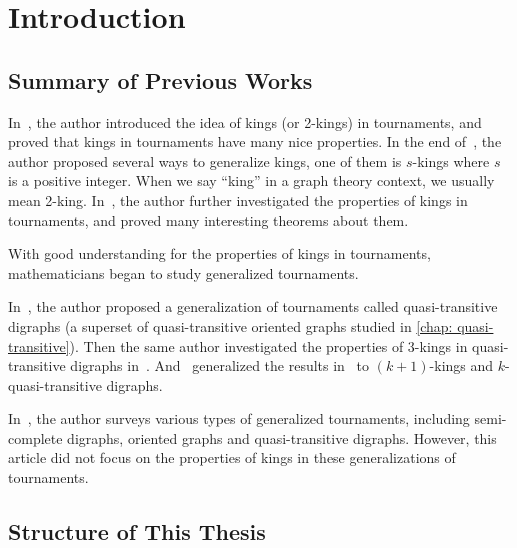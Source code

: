 \chapter{Introduction}

\section{Summary of Previous Works}

In~\cite{maurer_king_1980}, the author introduced
the idea of kings (or 2-kings) in tournaments,
and proved that kings in tournaments have many nice properties.
In the end of~\cite{maurer_king_1980},
the author proposed several ways to generalize kings,
one of them is \(s\)-kings where \(s\) is a positive integer.
When we say ``king'' in a graph theory context,
we usually mean 2-king.
In~\cite{reid_every_1982}, the author
further investigated the properties of kings in tournaments,
and proved many interesting theorems about them.

With good understanding for the properties of kings in tournaments,
mathematicians began to study generalized tournaments.

In~\cite{bangjensen_quasitransitive_1995}, the author
proposed a generalization of tournaments called
quasi-transitive digraphs (a superset of
quasi-transitive oriented graphs studied in \cref{chap: quasi-transitive}).
Then the same author investigated the properties
of 3-kings in quasi-transitive digraphs
in~\cite{bang-jensen_kings_1998}.
And~\cite{galeana-sanchez_existence_2013}
generalized the results in~\cite{bang-jensen_kings_1998}
to \((k+1)\)-kings and \(k\)-quasi-transitive digraphs.

In~\cite{bang-jensen_generalizations_1998},
the author surveys various types of generalized tournaments,
including semi-complete digraphs, oriented graphs and
quasi-transitive digraphs.
However, this article did not focus on the properties
of kings in these generalizations of tournaments.


\section{Structure of This Thesis}

